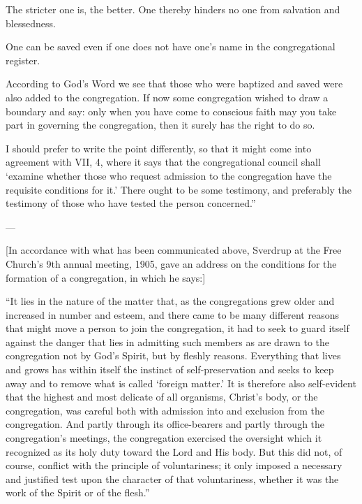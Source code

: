 The stricter one is, the better. One thereby hinders no one from salvation and blessedness.

One can be saved even if one does not have one’s name in the congregational register.

According to God’s Word we see that those who were baptized and saved were also added to the congregation. If now some congregation wished to draw a boundary and say: only when you have come to conscious faith may you take part in governing the congregation, then it surely has the right to do so.

I should prefer to write the point differently, so that it might come into agreement with VII, 4, where it says that the congregational council shall ‘examine whether those who request admission to the congregation have the requisite conditions for it.’ There ought to be some testimony, and preferably the testimony of those who have tested the person concerned.”

---

[In accordance with what has been communicated above, Sverdrup at the Free Church’s 9th annual meeting, 1905, gave an address on the conditions for the formation of a congregation, in which he says:]

“It lies in the nature of the matter that, as the congregations grew older and increased in number and esteem, and there came to be many different reasons that might move a person to join the congregation, it had to seek to guard itself against the danger that lies in admitting such members as are drawn to the congregation not by God’s Spirit, but by fleshly reasons. Everything that lives and grows has within itself the instinct of self-preservation and seeks to keep away and to remove what is called ‘foreign matter.’ It is therefore also self-evident that the highest and most delicate of all organisms, Christ’s body, or the congregation, was careful both with admission into and exclusion from the congregation. And partly through its office-bearers and partly through the congregation’s meetings, the congregation exercised the oversight which it recognized as its holy duty toward the Lord and His body. But this did not, of course, conflict with the principle of voluntariness; it only imposed a necessary and justified test upon the character of that voluntariness, whether it was the work of the Spirit or of the flesh.”
